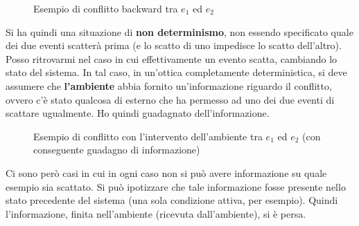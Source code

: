 \begin{definizione}
\begin{enumerate}
\begin{figure}[H]
      \caption{Esempio di conflitto backward tra $e_1$ ed $e_2$}
    \end{figure}
  \end{enumerate}
  Si ha quindi una situazione di \textbf{non determinismo}, non essendo
  specificato quale dei due eventi scatterà prima (e lo scatto di uno impedisce
  lo scatto dell'altro).
  Posso ritrovarmi nel caso in cui effettivamente un evento scatta, cambiando lo
  stato del sistema. In tal caso, in un'ottica completamente deterministica, si
  deve assumere che \textbf{l'ambiente} abbia fornito un'informazione
  riguardo il conflitto, ovvero c'è stato qualcosa di esterno che ha permesso ad
  uno dei due eventi di scattare ugualmente. Ho quindi guadagnato
  dell'informazione. 
  \begin{figure}[H]
    \centering
    \caption{Esempio di conflitto con l'intervento dell'ambiente tra $e_1$ ed
      $e_2$ (con conseguente guadagno di informazione)} 
  \end{figure}
  Ci sono però casi in cui in ogni caso non si può avere informazione su quale
  esempio sia scattato. Si può ipotizzare che tale informazione fosse presente
  nello stato precedente del sistema (una sola condizione attiva, per
  esempio). Quindi l'informazione, finita nell'ambiente (ricevuta
  dall'ambiente), si è persa.
  \begin{figure}[H]
    \centering
\end{figure}
\end{definizione}
